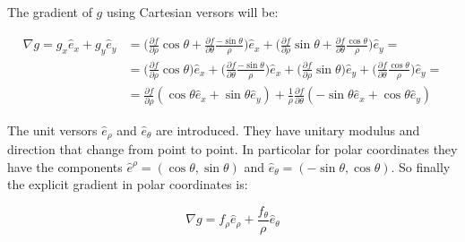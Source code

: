 	The gradient of $g$ using Cartesian versors will be:

	\begin{align*}
		\nabla g = g_x\hat{e}_x + g_y\hat{e}_y &= \biggl(\frac{\partial f}{\partial\rho}\cos\theta + \frac{\partial f}{\partial \theta}\frac{-\sin\theta}{\rho}\biggr)\hat{e}_x +\biggl(\frac{\partial f}{\partial\rho}\sin\theta + \frac{\partial f}{\partial \theta}\frac{\cos\theta}{\rho}\biggr)\hat{e}_y=\\
																					 &=\biggl(\frac{\partial f}{\partial\rho}\cos\theta\biggr)\hat{e}_x + \biggl(\frac{\partial f}{\partial \theta}\frac{-\sin\theta}{\rho}\biggr)\hat{e}_x +\biggl(\frac{\partial f}{\partial\rho}\sin\theta\biggr)\hat{e}_y + \biggl(\frac{\partial f}{\partial \theta}\frac{\cos\theta}{\rho}\biggr)\hat{e}_y=\\
																					 &=\frac{\partial f}{\partial\rho}(\cos\theta\hat{e}_x + \sin\theta\hat{e}_y) + \frac{1}{\rho}\frac{\partial f}{\partial\theta}(-\sin\theta\hat{e}_x + \cos\theta\hat{e}_y)
	\end{align*}

	The unit versors $\hat{e}_\rho$ and $\hat{e}_\theta$ are introduced.
	They have unitary modulus and direction that change from point to point.
	In particolar for polar coordinates they have the components $\hat{e}^\rho = (\cos\theta, \sin\theta)$ and $\hat{e}_\theta = (-\sin\theta, \cos\theta)$.
	So finally the explicit gradient in polar coordinates is:

	$$\nabla g = f_\rho\hat{e}_\rho + \frac{f_\theta}{\rho}\hat{e}_\theta$$
